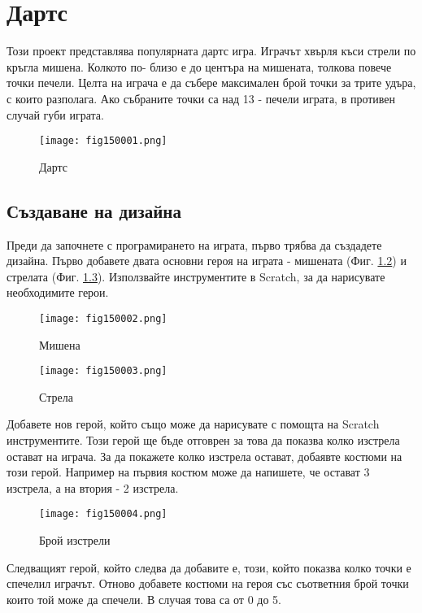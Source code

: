\chapter{Дартс}

Този проект представлява популярната дартс игра. Играчът хвърля къси стрели по кръгла мишена. Колкото по- близо е до центъра на мишената, толкова повече точки печели. Целта на играча е да събере максимален брой точки за трите удъра, с които разполага. Ако събраните точки са над 13 - печели играта, в противен случай губи играта.

\begin{figure}[H]
  \centering
  \texttt{[image: fig150001.png]}
  \caption{Дартс}
\label{fig150001}
\end{figure}

\section{Създаване на дизайна}
Преди да започнете с програмирането на играта, първо трябва да създадете дизайна. Първо добавете двата основни героя на играта - мишената (Фиг. \ref{fig150002}) и стрелата (Фиг. \ref{fig150003}). Използвайте инструментите в Scratch, за да нарисувате необходимите герои.

\begin{figure}[H]
  \centering
  \texttt{[image: fig150002.png]}
  \caption{Мишена}
\label{fig150002}
\end{figure}

\begin{figure}[H]
  \centering
  \texttt{[image: fig150003.png]}
  \caption{Стрела}
\label{fig150003}
\end{figure}

Добавете нов герой, който също може да нарисувате с помощта на Scratch инструментите. Този герой ще бъде отговрен за това да показва колко изстрела остават на играча. За да покажете колко изстрела остават, добаявте костюми на този герой. Например на първия костюм може да напишете, че остават 3 изстрела, а на втория - 2 изстрела.

\begin{figure}[H]
  \centering
  \texttt{[image: fig150004.png]}
  \caption{Брой изстрели}
\label{fig150004}
\end{figure}

Следващият герой, който следва да добавите е, този, който показва колко точки е спечелил играчът. Отново добавете костюми на героя със съответния брой точки които той може да спечели. В случая това са от 0 до 5.

